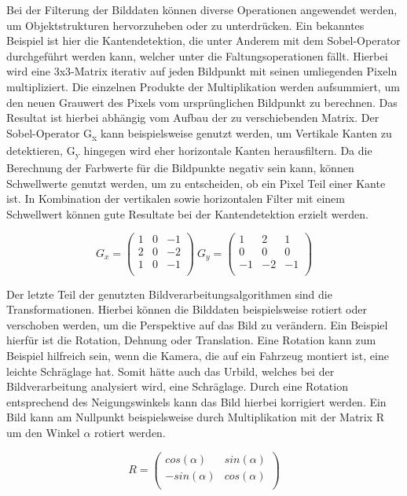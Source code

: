 Bei der Filterung der Bilddaten können diverse Operationen angewendet werden, um Objektstrukturen hervorzuheben oder zu unterdrücken. Ein bekanntes Beispiel ist hier die 
Kantendetektion, die unter Anderem mit dem Sobel-Operator durchgeführt werden kann, welcher unter die Faltungsoperationen fällt. Hierbei wird eine 3x3-Matrix iterativ auf jeden Bildpunkt mit seinen umliegenden Pixeln multipliziert.
Die einzelnen Produkte der Multiplikation werden aufsummiert, um den neuen Grauwert des Pixels vom ursprünglichen Bildpunkt zu berechnen. 
Das Resultat ist hierbei abhängig vom Aufbau der zu verschiebenden Matrix. Der Sobel-Operator G\textsubscript{x} kann beispielsweise genutzt werden, um Vertikale Kanten zu detektieren,
G\textsubscript{y} hingegen wird eher horizontale Kanten herausfiltern. Da die Berechnung der Farbwerte für die Bildpunkte negativ sein kann, können Schwellwerte genutzt werden, um
zu entscheiden, ob ein Pixel Teil einer Kante ist. In Kombination der vertikalen sowie horizontalen Filter mit einem Schwellwert können gute Resultate bei der Kantendetektion erzielt werden. \cite{Sobel}

\[
  G_x=
  \left( {\begin{array}{ccc}
   1 & 0 & -1\\
   2 & 0 & -2\\
   1 & 0 & -1\\
  \end{array} } \right)
\:
  G_y=
  \left( {\begin{array}{ccc}
   1 & 2 & 1\\
   0 & 0 & 0\\
   -1 & -2 & -1\\
  \end{array} } \right)
\]

Der letzte Teil der genutzten Bildverarbeitungsalgorithmen sind die Transformationen. Hierbei können die Bilddaten beispielsweise rotiert oder verschoben werden, um die Perspektive auf das Bild zu verändern.
Ein Beispiel hierfür ist die Rotation, Dehnung oder Translation. Eine Rotation kann zum Beispiel hilfreich sein, wenn die Kamera, die auf ein Fahrzeug montiert ist, eine leichte Schräglage hat.
Somit hätte auch das Urbild, welches bei der Bildverarbeitung analysiert wird, eine Schräglage. Durch eine Rotation entsprechend des Neigungswinkels kann das Bild hierbei korrigiert werden.
Ein Bild kann am Nullpunkt beispielsweise durch Multiplikation mit der Matrix R um den Winkel $\alpha$ rotiert werden.

\[
  R=
  \left( {\begin{array}{cc}
   cos(\alpha) & sin(\alpha)\\
   -sin(\alpha) & cos(\alpha)\\
  \end{array} } \right)
\]

